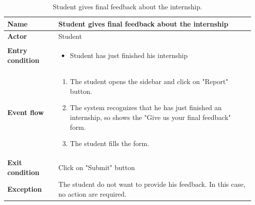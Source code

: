     \begin{table}[H]
        \centering
        \begin{tabular}{|l|p{11.9cm}|}
        \hline
        \textbf{Name}            & Student gives final feedback about the internship \\\hline
        \textbf{Actor}           & Student     \\\hline
        \textbf{Entry condition} &
        \begin{itemize}
              \item Student has just finished his internship
        \end{itemize}                                        \\\hline
        \textbf{Event flow}      &
        \begin{enumerate}[label=\arabic*.]
              \item The student opens the sidebar and click on "Report" button.
              \item The system recognizes that he has just finished an internship, so shows the "Give us your final feedback" form.
              \item The student fills the form.
              
        \end{enumerate}            \\\hline
        \textbf{Exit condition}  & Click on "Submit" button  \\\hline
        \textbf{Exception}       &  The student do not want to provide his feedback. In this case, no action are required.   \\\hline
        \end{tabular}
        \caption{Student gives final feedback about the internship.}
        \label{table:Student gives final feedback about the internship}
    \end{table}


